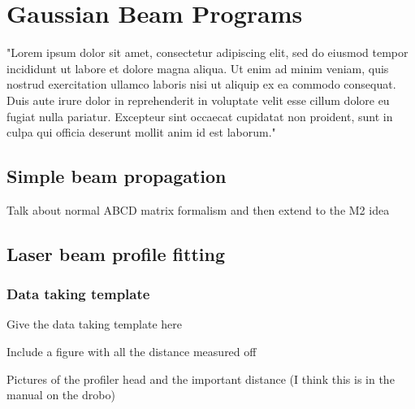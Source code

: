 \chapter{Gaussian Beam Programs} \label{app:gaussBeam}
"Lorem ipsum dolor sit amet, consectetur adipiscing elit, sed do eiusmod tempor incididunt ut labore et dolore magna aliqua. Ut enim ad minim veniam, quis nostrud exercitation ullamco laboris nisi ut aliquip ex ea commodo consequat. Duis aute irure dolor in reprehenderit in voluptate velit esse cillum dolore eu fugiat nulla pariatur. Excepteur sint occaecat cupidatat non proident, sunt in culpa qui officia deserunt mollit anim id est laborum."

\section{Simple beam propagation}
Talk about normal ABCD matrix formalism and then extend to the M2 idea

\section{Laser beam profile fitting}
\subsection{Data taking template}
Give the data taking template here

Include a figure with all the distance measured off

Pictures of the profiler head and the important distance (I think this is in the manual on the drobo)

